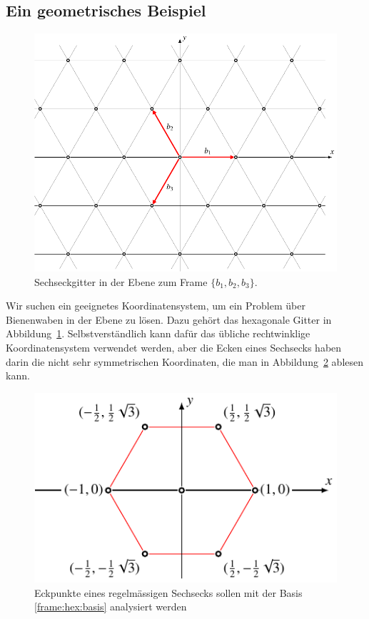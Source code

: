 \subsection{Ein geometrisches Beispiel
\label{subsection:hexagon}}
\begin{figure}
\centering
\includegraphics{chapters/1-geometrie/images/hexagon.pdf}
\caption{Sechseckgitter in der Ebene zum Frame $\{b_1,b_2,b_3\}$.
\label{geometrie:hexagon:image}}
\end{figure}
Wir suchen ein geeignetes Koordinatensystem, um ein Problem über
Bienenwaben in der Ebene zu lösen.
Dazu gehört das hexagonale Gitter in Abbildung~\ref{geometrie:hexagon:image}.
%
%
%
Selbstverständlich kann dafür das übliche rechtwinklige Koordinatensystem
verwendet werden, aber die Ecken eines Sechsecks haben darin die nicht
sehr symmetrischen Koordinaten, die man in Abbildung~\ref{frame:hex:sechseck}
ablesen kann.
\begin{figure}
\centering
\includegraphics{chapters/1-geometrie/images/hexagon1.pdf}
\caption{Eckpunkte eines regelmässigen Sechsecks sollen mit der
Basis \eqref{frame:hex:basis} analysiert werden
\label{frame:hex:sechseck}}
\end{figure}
